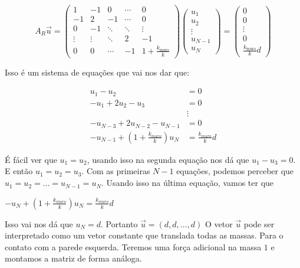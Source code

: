 \[
    A_R \vec{u} =
    \begin{pmatrix}
        1 & -1 & 0 & \cdots & 0 \\
        -1 & 2 & -1 & \cdots & 0 \\
        0 & -1 & \ddots & \ddots & \vdots \\
        \vdots & \vdots & \ddots & 2 & -1 \\
        0 & 0 & \cdots & -1 & 1 + \frac{k_{\text{muro}}}{k}
    \end{pmatrix}
    \begin{pmatrix}
        u_1 \\
        u_2 \\
        \vdots \\
        u_{N-1} \\
        u_{N}
    \end{pmatrix}
    =
    \begin{pmatrix}
        0 \\
        0 \\
        \vdots \\
        0 \\
        \frac{k_{\text{muro}}}{k} d
    \end{pmatrix}
\]

Isso é um sistema de equações que vai nos dar que:

\begin{align*}
    u_1 - u_2 &= 0 \\
    -u_1 + 2u_2 - u_3 &= 0 \\
    &\vdots \\
    -u_{N-3} + 2u_{N-2} - u_{N-1} &= 0 \\
    -u_{N-1} + \left(1 + \frac{k_{muro}}{k}\right)u_N &= \frac{k_{muro}}{k} d
\end{align*}

É fácil ver que $u_1 = u_2$, usando isso na segunda equação nos dá que $u_1-u_3=0$. E então $u_1=u_2=u_3$.
Com as primeiras $N-1$ equações, podemos perceber que $u_1 = u_2 = \dots = u_{N-1} = u_N$. Usando isso na última equação, vamos ter que
\begin{center}
    $-u_{N}+(1+\frac{k_{muro}}{k}) u_N = \frac{k_{muro}}{k} d$
\end{center}


Isso vai nos dá que $u_{N} = d$. Portanto $\vec{u} = (d, d, \dots, d)$
O vetor $\vec{u}$ pode ser interpretado como um vetor constante que translada todas as massas.
Para o contato com a parede esquerda. Teremos uma força adicional na massa $1$ e montamos a matriz de forma análoga.

